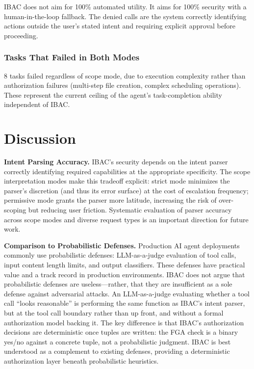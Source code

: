 \documentclass[11pt]{article}
\begin{document}
IBAC does not aim for 100\% automated utility. It aims for 100\% security with a human-in-the-loop fallback. The denied calls are the system correctly identifying actions outside the user's stated intent and requiring explicit approval before proceeding.

\subsubsection{Tasks That Failed in Both Modes}

8 tasks failed regardless of scope mode, due to execution complexity rather than authorization failures (multi-step file creation, complex scheduling operations). These represent the current ceiling of the agent's task-completion ability independent of IBAC.

\section{Discussion}

\textbf{Intent Parsing Accuracy.} IBAC's security depends on the intent parser correctly identifying required capabilities at the appropriate specificity. The scope interpretation modes make this tradeoff explicit: strict mode minimizes the parser's discretion (and thus its error surface) at the cost of escalation frequency; permissive mode grants the parser more latitude, increasing the risk of over-scoping but reducing user friction. Systematic evaluation of parser accuracy across scope modes and diverse request types is an important direction for future work.

\textbf{Comparison to Probabilistic Defenses.} Production AI agent deployments commonly use probabilistic defenses: LLM-as-a-judge evaluation of tool calls, input content length limits, and output classifiers. These defenses have practical value and a track record in production environments. IBAC does not argue that probabilistic defenses are useless---rather, that they are insufficient as a sole defense against adversarial attacks. An LLM-as-a-judge evaluating whether a tool call ``looks reasonable'' is performing the same function as IBAC's intent parser, but at the tool call boundary rather than up front, and without a formal authorization model backing it. The key difference is that IBAC's authorization decisions are deterministic once tuples are written: the FGA check is a binary yes/no against a concrete tuple, not a probabilistic judgment. IBAC is best understood as a complement to existing defenses, providing a deterministic authorization layer beneath probabilistic heuristics.
\end{document}

